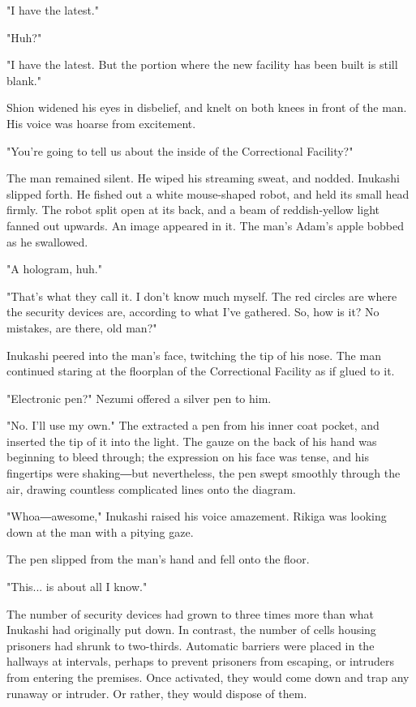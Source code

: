 "I have the latest."

"Huh?"

"I have the latest. But the portion where the new facility has been
built is still blank."

Shion widened his eyes in disbelief, and knelt on both knees in front of
the man. His voice was hoarse from excitement.

"You're going to tell us about the inside of the Correctional Facility?"

The man remained silent. He wiped his streaming sweat, and nodded.
Inukashi slipped forth. He fished out a white mouse-shaped robot, and
held its small head firmly. The robot split open at its back, and a beam
of reddish-yellow light fanned out upwards. An image appeared in it. The
man's Adam's apple bobbed as he swallowed.

"A hologram, huh."

"That's what they call it. I don't know much myself. The red circles are
where the security devices are, according to what I've gathered. So, how
is it? No mistakes, are there, old man?"

Inukashi peered into the man's face, twitching the tip of his nose. The
man continued staring at the floorplan of the Correctional Facility as
if glued to it.

"Electronic pen?" Nezumi offered a silver pen to him.

"No. I'll use my own." The extracted a pen from his inner coat pocket,
and inserted the tip of it into the light. The gauze on the back of his
hand was beginning to bleed through; the expression on his face was
tense, and his fingertips were shaking―but nevertheless, the pen swept
smoothly through the air, drawing countless complicated lines onto the
diagram.

"Whoa―awesome," Inukashi raised his voice amazement. Rikiga was looking
down at the man with a pitying gaze.

The pen slipped from the man's hand and fell onto the floor.

"This... is about all I know."

The number of security devices had grown to three times more than what
Inukashi had originally put down. In contrast, the number of cells
housing prisoners had shrunk to two-thirds. Automatic barriers were
placed in the hallways at intervals, perhaps to prevent prisoners from
escaping, or intruders from entering the premises. Once activated, they
would come down and trap any runaway or intruder. Or rather, they would
dispose of them.

